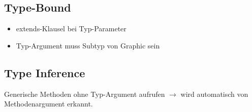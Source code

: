 	\begin{minipage}[t]{9cm}
		\subsection*{Type-Bound}
		\begin{itemize}[noitemsep]
			\item extends-Klausel bei Typ-Parameter
			\item Typ-Argument muss Subtyp von Graphic sein
		\end{itemize}
		
	\end{minipage}
	\hspace*{0.5cm}
	\begin{minipage}[t]{9.3cm}
		\subsection*{Type Inference}
		Generische Methoden ohne Typ-Argument aufrufen $\rightarrow$ wird automatisch von Methodenargument erkannt.
		
	\end{minipage}